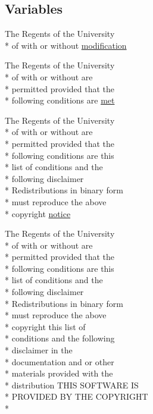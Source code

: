 \subsection*{Variables}
\begin{DoxyCompactItemize}
\item 
The Regents of the University \\*
of with or without \hyperlink{_l_i_c_e_n_s_e_adff118fbbe42e794a943dd26fa67d950}{modification}
\item 
The Regents of the University \\*
of with or without are \\*
permitted provided that the \\*
following conditions are \hyperlink{_l_i_c_e_n_s_e_add0ececc6159b5bcb7b96a52b306b3b9}{met}
\item 
The Regents of the University \\*
of with or without are \\*
permitted provided that the \\*
following conditions are this \\*
list of conditions and the \\*
following disclaimer \\*
Redistributions in binary form \\*
must reproduce the above \\*
copyright \hyperlink{_l_i_c_e_n_s_e_a837635f661210e45c369790de92e1296}{notice}
\item 
The Regents of the University \\*
of with or without are \\*
permitted provided that the \\*
following conditions are this \\*
list of conditions and the \\*
following disclaimer \\*
Redistributions in binary form \\*
must reproduce the above \\*
copyright this list of \\*
conditions and the following \\*
disclaimer in the \\*
documentation and or other \\*
materials provided with the \\*
distribution T\+H\+I\+S S\+O\+F\+T\+W\+A\+R\+E I\+S \\*
P\+R\+O\+V\+I\+D\+E\+D B\+Y T\+H\+E C\+O\+P\+Y\+R\+I\+G\+H\+T \\*

\end{DoxyCompactItemize}
